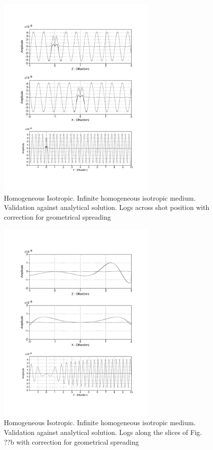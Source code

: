 \begin{figure}[]
\centering 
\includegraphics[width=0.7\textwidth]{images/fig_dsfdm/fig1_log_homogeneous_isotropic.pdf}
\caption{Homogeneous Isotropic. Infinite homogeneous isotropic medium. Validation against analytical
solution. Logs across shot position with correction for geometrical spreading}
\label{fig1_log_homogeneous_isotropic} 
\end{figure}
\begin{figure}[]
\centering 
\includegraphics[width=0.7\textwidth]{images/fig_dsfdm/fig2_log_homogeneous_isotropic.pdf}
\caption{Homogeneous Isotropic. Infinite homogeneous isotropic medium. Validation against analytical
solution. Logs along the slices of Fig. ??b with correction for geometrical spreading}
\label{fig2_log_homogeneous_isotropic} 
\end{figure} 

